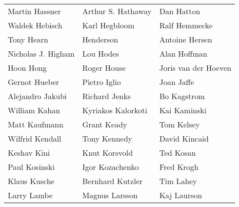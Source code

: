 \begin{tabular}{lll}
Martin Hassner         & Arthur S. Hathaway     & Dan Hatton\\
Waldek Hebisch         & Karl Hegbloom          & Ralf Hemmecke\\
Tony Hearn             & Henderson              & Antoine Hersen\\
Nicholas J. Higham     & Lou Hodes              & Alan Hoffman\\
Hoon Hong              & Roger House            & Joris van der Hoeven\\
Gernot Hueber          & Pietro Iglio           & Joan Jaffe\\
Alejandro Jakubi       & Richard Jenks          & Bo Kagstrom\\
William Kahan          & Kyriakos Kalorkoti     & Kai Kaminski\\
Matt Kaufmann          & Grant Keady            & Tom Kelsey\\
Wilfrid Kendall        & Tony Kennedy           & David Kincaid\\
Keshav Kini            & Knut Korsvold          & Ted Kosan\\
Paul Kosinski          & Igor Kozachenko        & Fred Krogh\\
Klaus Kusche           & Bernhard Kutzler       & Tim Lahey\\
Larry Lambe            & Magnus Larsson         & Kaj Laurson\\
\end{tabular}
\vfill
\newpage

